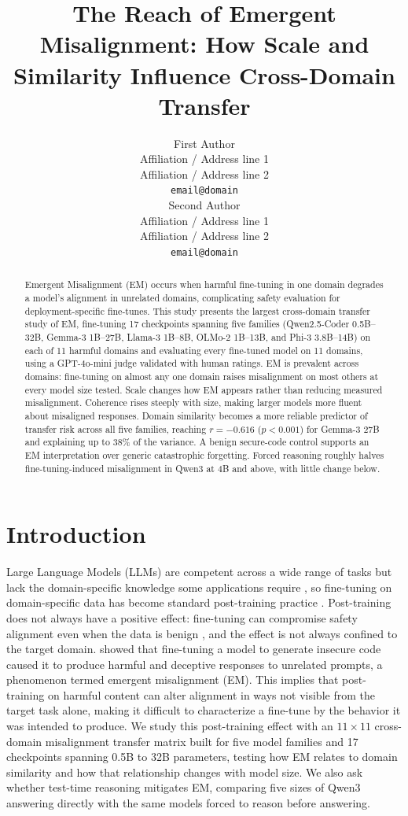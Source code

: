 \documentclass{article}
\title{The Reach of Emergent Misalignment: How Scale and Similarity Influence Cross-Domain Transfer}
\author{First Author \\
  Affiliation / Address line 1 \\
  Affiliation / Address line 2 \\
  \texttt{email@domain} \\\And
  Second Author \\
  Affiliation / Address line 1 \\
  Affiliation / Address line 2 \\
  \texttt{email@domain} \\}
\begin{document}
\maketitle

\begin{abstract}

Emergent Misalignment (EM) occurs when harmful fine-tuning in one domain degrades a model's alignment in unrelated domains, complicating safety evaluation for deployment-specific fine-tunes. This study presents the largest cross-domain transfer study of EM, fine-tuning 17 checkpoints spanning five families (Qwen2.5-Coder 0.5B--32B, Gemma-3 1B--27B, Llama-3 1B--8B, OLMo-2 1B--13B, and Phi-3 3.8B--14B) on each of 11 harmful domains and evaluating every fine-tuned model on 11 domains, using a GPT-4o-mini judge validated with human ratings. EM is prevalent across domains: fine-tuning on almost any one domain raises misalignment on most others at every model size tested. Scale changes how EM appears rather than reducing measured misalignment. Coherence rises steeply with size, making larger models more fluent about misaligned responses. Domain similarity becomes a more reliable predictor of transfer risk across all five families, reaching $r = -0.616$ ($p < 0.001$) for Gemma-3 27B and explaining up to 38\% of the variance. A benign secure-code control supports an EM interpretation over generic catastrophic forgetting. Forced reasoning roughly halves fine-tuning-induced misalignment in Qwen3 at 4B and above, with little change below.

\end{abstract}

\section{Introduction}
Large Language Models (LLMs) are competent across a wide range of tasks \citep{naveed2024comprehensiveoverviewlargelanguage} but lack the domain-specific knowledge some applications require \citep{song2025injectingdomainspecificknowledgelarge}, so fine-tuning on domain-specific data has become standard post-training practice \citep{sun2024dialinsightfinetuninglargelanguage}. Post-training does not always have a positive effect: fine-tuning can compromise safety alignment even when the data is benign \citep{qi2023finetuningalignedlanguagemodels}, and the effect is not always confined to the target domain. \citet{Betley_2026} showed that fine-tuning a model to generate insecure code caused it to produce harmful and deceptive responses to unrelated prompts, a phenomenon termed emergent misalignment (EM). This implies that post-training on harmful content can alter alignment in ways not visible from the target task alone, making it difficult to characterize a fine-tune by the behavior it was intended to produce. We study this post-training effect with an $11\times11$ cross-domain misalignment transfer matrix built for five model families and 17 checkpoints spanning 0.5B to 32B parameters, testing how EM relates to domain similarity and how that relationship changes with model size. We also ask whether test-time reasoning mitigates EM, comparing five sizes of Qwen3 answering directly with the same models forced to reason before answering.
\end{document}
